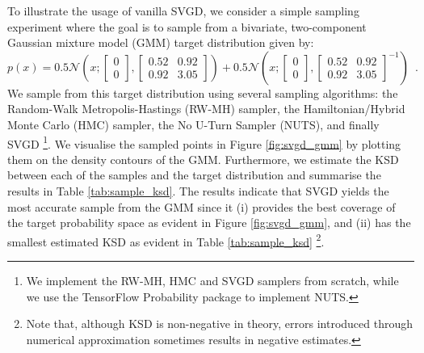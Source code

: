 To illustrate the usage of vanilla SVGD, we consider a simple sampling experiment where the goal is to sample from a bivariate, two-component Gaussian mixture model (GMM) target distribution given by:
\begin{equation*}
p(x) = 0.5 \mathcal{N}\left(x;\begin{bmatrix}0 \\ 0 \end{bmatrix}, \begin{bmatrix}0.52 & 0.92 \\ 0.92 & 3.05 \end{bmatrix} \right) +  0.5 \mathcal{N}\left(x;\begin{bmatrix}0 \\ 0 \end{bmatrix}, \begin{bmatrix}0.52 & 0.92 \\ 0.92 & 3.05 \end{bmatrix}^{-1}\right) \enspace.
\end{equation*}
We sample from this target distribution using several sampling algorithms: the Random-Walk Metropolis-Hastings (RW-MH) sampler, the Hamiltonian/Hybrid Monte Carlo \citep{duane_hmc} (HMC) sampler, the No U-Turn Sampler \citep{hoffman_nuts} (NUTS), and finally SVGD \footnote{We implement the RW-MH, HMC and SVGD samplers from scratch, while we use the TensorFlow Probability package \citep{tensorflow} to implement NUTS.}. We visualise the sampled points in Figure \ref{fig:svgd_gmm} by plotting them on the density contours of the GMM. Furthermore, we estimate the KSD between each of the samples and the target distribution and summarise the results in Table \ref{tab:sample_ksd}. The results indicate that SVGD yields the most accurate sample from the GMM since it (i) provides the best coverage of the target probability space as evident in Figure \ref{fig:svgd_gmm}, and (ii) has the smallest estimated KSD as evident in Table \ref{tab:sample_ksd} \footnote{Note that, although KSD is non-negative in theory, errors introduced through numerical approximation sometimes results in negative estimates.}.

